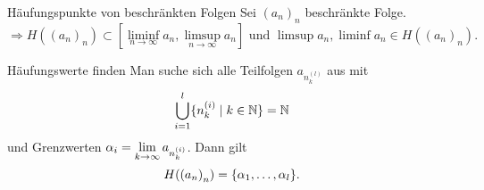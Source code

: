 \documentclass[main.tex]{subfiles}
\begin{document}
\begin{karte}{Häufungspunkte von beschränkten Folgen}
    Sei \({(a_n)}_n\) beschränkte Folge.
    \[ \Rightarrow H({(a_n)}_n) \subset 
    [ \liminf\limits_{n\rightarrow\infty}a_n, 
    \limsup\limits_{n\rightarrow\infty}a_n ] 
    \text{ und } \limsup a_n, \liminf a_n \in 
    H({(a_n)}_n). \]
\end{karte}
\begin{karte}{Häufungswerte finden}
    Man suche sich alle Teilfolgen \( a_{n_k^{(l)}} \) aus mit 
    \[ \bigcup_{i=1}^l \{ n_k^{(i)} \;\vert\; k\in \mathbb{N} \} = \mathbb{N} \]
    und Grenzwerten \( \alpha_i = \lim\limits_{k\rightarrow\infty} a_{n_k^{(i)}} \).
    Dann gilt
    \[ H({(a_n)}_n) = \{ \alpha_1, \ldots, \alpha_l \}. \]
\end{karte}
\end{document}
